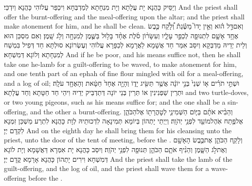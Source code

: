 {וְיַסֵּיק כָּהֲנָא יָת עֲלָתָא וְיָת מִנְחָתָא לְמַדְבְּחָא וִיכַפַּר עֲלוֹהִי כָּהֲנָא וְיִדְכֵּי׃}
{And the priest shall offer the burnt-offering and the meal-offering upon the altar; and the priest shall make atonement for him, and he shall be clean.}{}
{וְאִם\maqqaf דַּ֣ל ה֗וּא וְאֵ֣ין יָדוֹ֮ מַשֶּׂ֒גֶת֒ וְ֠לָקַ֠ח כֶּ֣בֶשׂ אֶחָ֥ד אָשָׁ֛ם לִתְנוּפָ֖ה לְכַפֵּ֣ר עָלָ֑יו וְעִשָּׂר֨וֹן סֹ֜לֶת אֶחָ֨ד בָּל֥וּל בַּשֶּׁ֛מֶן לְמִנְחָ֖ה וְלֹ֥ג שָֽׁמֶן׃}
{וְאִם מִסְכֵּן הוּא וְלֵית יְדֵיהּ מַדְבְּקָא וְיִסַּב אִמַּר חַד אֲשָׁמָא לַאֲרָמָא לְכַפָּרָא עֲלוֹהִי וְעֶשְׂרוֹנָא סוּלְתָּא חַד דְּפִיל בִּמְשַׁח לְמִנְחָתָא וְלוֹגָא דְּמִשְׁחָא׃}
{And if he be poor, and his means suffice not, then he shall take one he-lamb for a guilt-offering to be waved, to make atonement for him, and one tenth part of an ephah of fine flour mingled with oil for a meal-offering, and a log of oil;}{}
{וּשְׁתֵּ֣י תֹרִ֗ים א֤וֹ שְׁנֵי֙ בְּנֵ֣י יוֹנָ֔ה אֲשֶׁ֥ר תַּשִּׂ֖יג יָד֑וֹ וְהָיָ֤ה אֶחָד֙ חַטָּ֔את וְהָאֶחָ֖ד עֹלָֽה׃}
{וּתְרֵין שַׁפְנִינִין אוֹ תְּרֵין בְּנֵי יוֹנָה דְּתַדְבֵּיק יְדֵיהּ וִיהֵי חַד חַטָּתָא וְחַד עֲלָתָא׃}
{and two turtle-doves, or two young pigeons, such as his means suffice for; and the one shall be a sin-offering, and the other a burnt-offering.}{}
{וְהֵבִ֨יא אֹתָ֜ם בַּיּ֧וֹם הַשְּׁמִינִ֛י לְטׇהֳרָת֖וֹ אֶל\maqqaf הַכֹּהֵ֑ן אֶל\maqqaf פֶּ֥תַח אֹֽהֶל\maqqaf מוֹעֵ֖ד לִפְנֵ֥י יְהֹוָֽה׃}
{וְיַיְתֵי יָתְהוֹן בְּיוֹמָא תְּמִינָאָה לִדְכוּתֵיהּ לְוָת כָּהֲנָא לִתְרַע מַשְׁכַּן זִמְנָא לִקְדָם יְיָ׃}
{And on the eighth day he shall bring them for his cleansing unto the priest, unto the door of the tent of meeting, before the \lord.}{}
{וְלָקַ֧ח הַכֹּהֵ֛ן אֶת\maqqaf כֶּ֥בֶשׂ הָאָשָׁ֖ם וְאֶת\maqqaf לֹ֣ג הַשָּׁ֑מֶן וְהֵנִ֨יף אֹתָ֧ם הַכֹּהֵ֛ן תְּנוּפָ֖ה לִפְנֵ֥י יְהֹוָֽה׃}
{וְיִסַּב כָּהֲנָא יָת אִמְּרָא דַּאֲשָׁמָא וְיָת לוֹגָא דְּמִשְׁחָא וִירִים יָתְהוֹן כָּהֲנָא אָרָמָא קֳדָם יְיָ׃}
{And the priest shall take the lamb of the guilt-offering, and the log of oil, and the priest shall wave them for a wave-offering before the \lord.}{}
